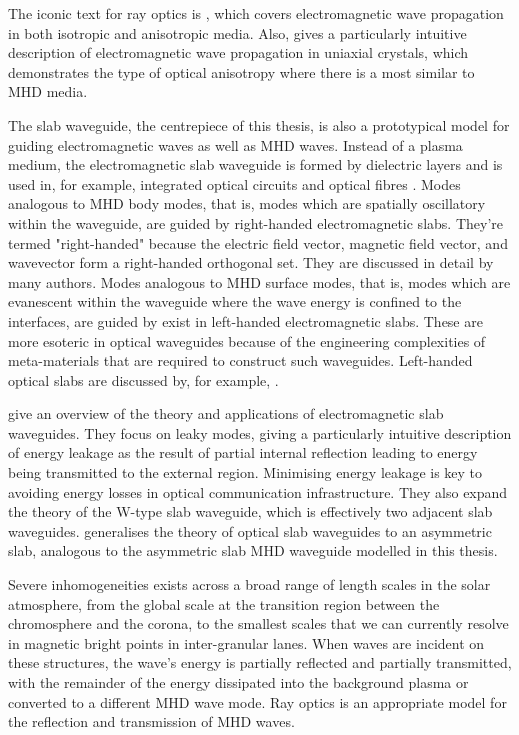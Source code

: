 \documentclass[12pt]{../style-files/ociamthesis}
\begin{document}
	The iconic text for ray optics is \cite{bor_etal99}, which covers electromagnetic wave propagation in both isotropic and anisotropic media. Also, \cite{vei_etal10} gives a particularly intuitive description of electromagnetic wave propagation in uniaxial crystals, which demonstrates the type of optical anisotropy where there is a  most similar to MHD media.
	
	The slab waveguide, the centrepiece of this thesis, is also a prototypical model for guiding electromagnetic waves as well as MHD waves. Instead of a plasma medium, the electromagnetic slab waveguide is formed by dielectric layers and is used in, for example, integrated optical circuits and optical fibres \citep{ram_etal84}. Modes analogous to MHD body modes, that is, modes which are spatially oscillatory within the waveguide, are guided by right-handed electromagnetic slabs. They're termed "right-handed" because the electric field vector, magnetic field vector, and wavevector form a right-handed orthogonal set. They are discussed in detail by many authors\citep{ram_etal84}. Modes analogous to MHD surface modes, that is, modes which are evanescent within the waveguide where the wave energy is confined to the interfaces, are guided by exist in left-handed electromagnetic slabs. These are more esoteric in optical waveguides because of the engineering complexities of meta-materials that are required to construct such waveguides. Left-handed optical slabs are discussed by, for example, \cite{wan_etal08,ash13,sha_etal03}.
	
	\cite{Hu_etal09} give an overview of the theory and applications of electromagnetic slab waveguides. They focus on leaky modes, giving a particularly intuitive description of energy leakage as the result of partial internal reflection leading to energy being transmitted to the external region. Minimising energy leakage is key to avoiding energy losses in optical communication infrastructure. They also expand the theory of the W-type slab waveguide, which is effectively two adjacent slab waveguides. \cite{mar74} generalises the theory of optical slab waveguides to an asymmetric slab, analogous to the asymmetric slab MHD waveguide modelled in this thesis.
	
	Severe inhomogeneities exists across a broad range of length scales in the solar atmosphere, from the global scale at the transition region between the chromosphere and the corona, to the smallest scales that we can currently resolve in magnetic bright points in inter-granular lanes. When waves are incident on these structures, the wave's energy is partially reflected and partially transmitted, with the remainder of the energy dissipated into the background plasma or converted to a different MHD wave mode. Ray optics is an appropriate model for the reflection and transmission of MHD waves.
	
\end{document}
